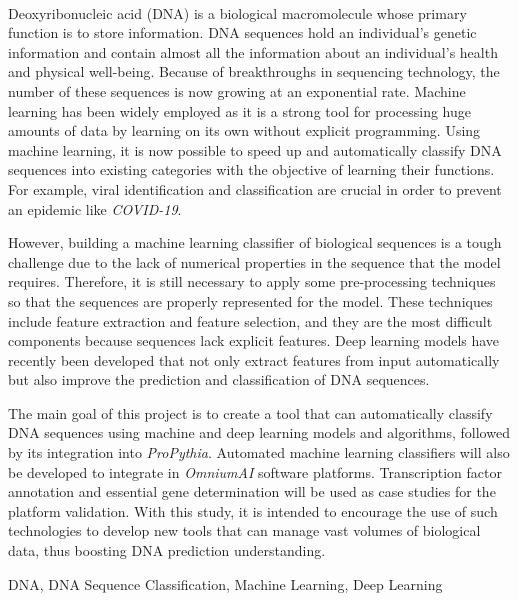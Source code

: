 {\large \textbf{\thetitle}}\\[1ex]
\noindent Deoxyribonucleic acid (DNA) is a biological macromolecule whose primary function is to store information. DNA sequences hold an individual's genetic information and contain almost all the information about an individual's health and physical well-being. Because of breakthroughs in sequencing technology, the number of these sequences is now growing at an exponential rate. Machine learning has been widely employed as it is a strong tool for processing huge amounts of data by learning on its own without explicit programming. Using machine learning, it is now possible to speed up and automatically classify DNA sequences into existing categories with the objective of learning their functions. For example, viral identification and classification are crucial in order to prevent an epidemic like \emph{COVID-19}.

However, building a machine learning classifier of biological sequences is a tough challenge due to the lack of numerical properties in the sequence that the model requires. Therefore, it is still necessary to apply some pre-processing techniques so that the sequences are properly represented for the model. These techniques include feature extraction and feature selection, and they are the most difficult components because sequences lack explicit features. Deep learning models have recently been developed that not only extract features from input automatically but also improve the prediction and classification of DNA sequences.

The main goal of this project is to create a tool that can automatically classify DNA sequences using machine and deep learning models and algorithms, followed by its integration into \textit{ProPythia}. Automated machine learning classifiers will also be developed to integrate in \textit{OmniumAI} software platforms. Transcription factor annotation and essential gene determination will be used as case studies for the platform validation. With this study, it is intended to encourage the use of such technologies to develop new tools that can manage vast volumes of biological data, thus boosting DNA prediction understanding.

\begin{keywords}
DNA, DNA Sequence Classification, Machine Learning, Deep Learning
\end{keywords} 
